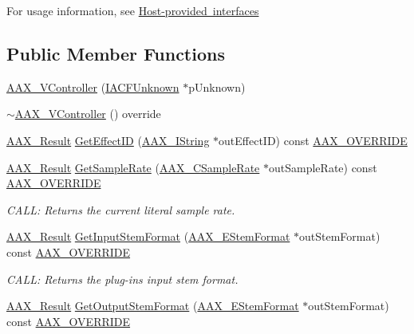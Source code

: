 For usage information, see \mbox{\hyperlink{a00827_using_acf_host_provided_interfaces}{Host-\/provided interfaces}} \subsection*{Public Member Functions}
\begin{DoxyCompactItemize}
\item 
\mbox{\hyperlink{a01905_ae2076dd569e3ae5e2bdc3934e3392493}{A\+A\+X\+\_\+\+V\+Controller}} (\mbox{\hyperlink{a01409}{I\+A\+C\+F\+Unknown}} $\ast$p\+Unknown)
\item 
\mbox{\hyperlink{a01905_a04a40d0ff0c5982cdbb74fad57072ac1}{$\sim$\+A\+A\+X\+\_\+\+V\+Controller}} () override
\item 
\mbox{\hyperlink{a00392_a4d8f69a697df7f70c3a8e9b8ee130d2f}{A\+A\+X\+\_\+\+Result}} \mbox{\hyperlink{a01905_ae1c1956d5ddd00afa59bd914a44b24da}{Get\+Effect\+ID}} (\mbox{\hyperlink{a01873}{A\+A\+X\+\_\+\+I\+String}} $\ast$out\+Effect\+ID) const \mbox{\hyperlink{a00392_ac2f24a5172689ae684344abdcce55463}{A\+A\+X\+\_\+\+O\+V\+E\+R\+R\+I\+DE}}
\item 
\mbox{\hyperlink{a00392_a4d8f69a697df7f70c3a8e9b8ee130d2f}{A\+A\+X\+\_\+\+Result}} \mbox{\hyperlink{a01905_a05b912d5178b1420b014da3b8e98e7cd}{Get\+Sample\+Rate}} (\mbox{\hyperlink{a00392_a3d9eea08f47e0b0a23432e15baa4e885}{A\+A\+X\+\_\+\+C\+Sample\+Rate}} $\ast$out\+Sample\+Rate) const \mbox{\hyperlink{a00392_ac2f24a5172689ae684344abdcce55463}{A\+A\+X\+\_\+\+O\+V\+E\+R\+R\+I\+DE}}
\begin{DoxyCompactList}\small\item\em C\+A\+LL\+: Returns the current literal sample rate. \end{DoxyCompactList}\item 
\mbox{\hyperlink{a00392_a4d8f69a697df7f70c3a8e9b8ee130d2f}{A\+A\+X\+\_\+\+Result}} \mbox{\hyperlink{a01905_a58e102ae406dd0fbf022d4364e6e24d0}{Get\+Input\+Stem\+Format}} (\mbox{\hyperlink{a00491_ad8af5ef008b2bd478add9a0acb0a1d85}{A\+A\+X\+\_\+\+E\+Stem\+Format}} $\ast$out\+Stem\+Format) const \mbox{\hyperlink{a00392_ac2f24a5172689ae684344abdcce55463}{A\+A\+X\+\_\+\+O\+V\+E\+R\+R\+I\+DE}}
\begin{DoxyCompactList}\small\item\em C\+A\+LL\+: Returns the plug-\/in\textquotesingle{}s input stem format. \end{DoxyCompactList}\item 
\mbox{\hyperlink{a00392_a4d8f69a697df7f70c3a8e9b8ee130d2f}{A\+A\+X\+\_\+\+Result}} \mbox{\hyperlink{a01905_a01a96e488251716cfc236551b9f9a2fb}{Get\+Output\+Stem\+Format}} (\mbox{\hyperlink{a00491_ad8af5ef008b2bd478add9a0acb0a1d85}{A\+A\+X\+\_\+\+E\+Stem\+Format}} $\ast$out\+Stem\+Format) const \mbox{\hyperlink{a00392_ac2f24a5172689ae684344abdcce55463}{A\+A\+X\+\_\+\+O\+V\+E\+R\+R\+I\+DE}}

\end{DoxyCompactItemize}
